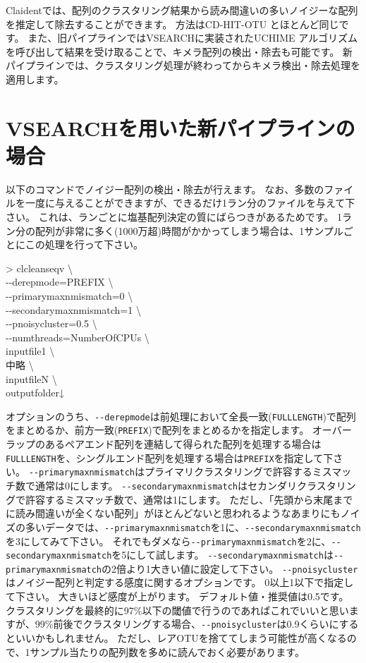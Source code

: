 \documentclass[titlepage,10pt,a4paper,english]{jsbook}
\newenvironment{cmd}{\begin{oframed}\raggedright\ttfamily\footnotesize\setlength{\baselineskip}{1.4em}}{\end{oframed}\vspace{-1em}}
\begin{document}
Claidentでは、配列のクラスタリング結果から読み間違いの多いノイジーな配列を推定して除去することができます。
方法はCD-HIT-OTU \citep{Li2012}とほとんど同じです。
また、旧パイプラインではVSEARCHに実装されたUCHIME \citep{Edgar2011}アルゴリズムを呼び出して結果を受け取ることで、キメラ配列の検出・除去も可能です。
新パイプラインでは、クラスタリング処理が終わってからキメラ検出・除去処理を適用します。

\section{VSEARCHを用いた新パイプラインの場合}

以下のコマンドでノイジー配列の検出・除去が行えます。
なお、多数のファイルを一度に与えることができますが、できるだけ1ラン分のファイルを与えて下さい。
これは、ランごとに塩基配列決定の質にばらつきがあるためです。
1ラン分の配列が非常に多く(1000万超)時間がかかってしまう場合は、1サンプルごとにこの処理を行って下さい。
\begin{cmd}
{\textgreater} clcleanseqv {\textbackslash}\\
{-}{-}derepmode=PREFIX {\textbackslash}\\
{-}{-}primarymaxnmismatch=0 {\textbackslash}\\
{-}{-}secondarymaxnmismatch=1 {\textbackslash}\\
{-}{-}pnoisycluster=0.5 {\textbackslash}\\
{-}{-}numthreads=NumberOfCPUs {\textbackslash}\\
inputfile1 {\textbackslash}\\
中略 {\textbackslash}\\
inputfileN {\textbackslash}\\
outputfolder↓
\end{cmd}
オプションのうち、\texttt{{-}{-}derepmode}は前処理において全長一致(\texttt{FULLLENGTH})で配列をまとめるか、前方一致(\texttt{PREFIX})で配列をまとめるかを指定します。
オーバーラップのあるペアエンド配列を連結して得られた配列を処理する場合は\texttt{FULLLENGTH}を、シングルエンド配列を処理する場合は\texttt{PREFIX}を指定して下さい。
\texttt{{-}{-}primarymaxnmismatch}はプライマリクラスタリングで許容するミスマッチ数で通常は0にします。
\texttt{{-}{-}secondarymaxnmismatch}はセカンダリクラスタリングで許容するミスマッチ数で、通常は1にします。
ただし、「先頭から末尾までに読み間違いが全くない配列」がほとんどないと思われるようなあまりにもノイズの多いデータでは、\texttt{{-}{-}primarymaxnmismatch}を1に、\texttt{{-}{-}secondarymaxnmismatch}を3にしてみて下さい。
それでもダメなら\texttt{{-}{-}primarymaxnmismatch}を2に、\texttt{{-}{-}secondarymaxnmismatch}を5にして試します。
\texttt{{-}{-}secondarymaxnmismatch}は\texttt{{-}{-}primarymaxnmismatch}の2倍より1大きい値に設定して下さい。
\texttt{{-}{-}pnoisycluster}はノイジー配列と判定する感度に関するオプションです。
0以上1以下で指定して下さい。
大きいほど感度が上がります。
デフォルト値・推奨値は0.5です。
クラスタリングを最終的に97\%以下の閾値で行うのであればこれでいいと思いますが、99\%前後でクラスタリングする場合、\texttt{{-}{-}pnoisycluster}は0.9くらいにするといいかもしれません。
ただし、レアOTUを捨ててしまう可能性が高くなるので、1サンプル当たりの配列数を多めに読んでおく必要があります。
\end{document}
